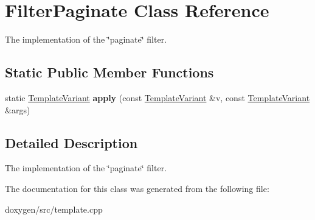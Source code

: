 \hypertarget{class_filter_paginate}{}\section{Filter\+Paginate Class Reference}
\label{class_filter_paginate}


The implementation of the \char`\"{}paginate\char`\"{} filter.  


\subsection*{Static Public Member Functions}
\begin{DoxyCompactItemize}
\item 
\mbox{\label{class_filter_paginate_a490b7dcb03be0584757808e8f04e1228}} 
static \mbox{\hyperlink{class_template_variant}{Template\+Variant}} {\bfseries apply} (const \mbox{\hyperlink{class_template_variant}{Template\+Variant}} \&v, const \mbox{\hyperlink{class_template_variant}{Template\+Variant}} \&args)
\end{DoxyCompactItemize}


\subsection{Detailed Description}
The implementation of the \char`\"{}paginate\char`\"{} filter. 

The documentation for this class was generated from the following file\+:\begin{DoxyCompactItemize}
\item 
doxygen/src/template.\+cpp\end{DoxyCompactItemize}
